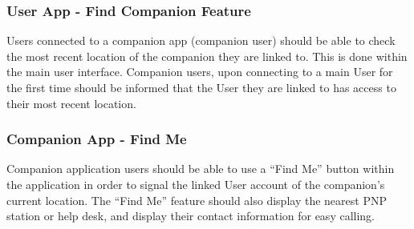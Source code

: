 \subsubsection{User App - Find Companion Feature}
Users connected to a companion app (companion user) should be able to check the most recent location of the companion they are linked to. This is done within the main user interface. Companion users, upon connecting to a main User for the first time should be informed that the User they are linked to has access to their most recent location.

\subsubsection{Companion App - Find Me}
Companion application users should be able to use a “Find Me” button within the application in order to signal the linked User account of the companion’s current location. The “Find Me” feature should also display the nearest PNP station or help desk, and display their contact information for easy calling.